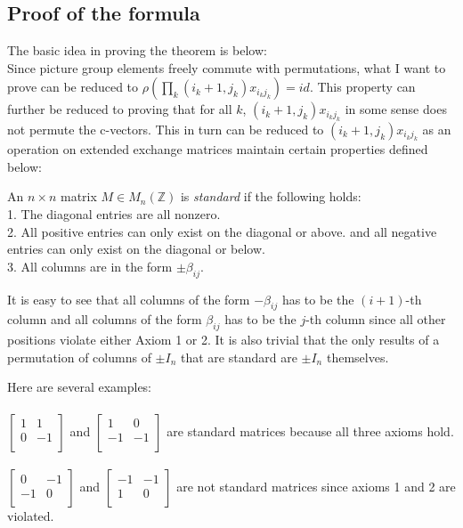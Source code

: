 \subsection{Proof of the formula}
\indent The basic idea in proving the theorem is below:\\
\indent Since picture group elements freely commute with permutations, what I want to prove can be reduced to  $\rho(\prod_{k}(i_k+1,j_k)x_{i_kj_k})=id$. This property can further be reduced to proving that for all $k$, $(i_k+1,j_k)x_{i_kj_k}$ in some sense does not permute the c-vectors. This in turn can be reduced to $(i_k+1,j_k)x_{i_kj_k}$ as an operation on extended exchange matrices maintain certain properties defined below:\\
\begin{definition}
An $n\times n$ matrix $M\in M_n(\mathbb{Z})$ is \textit{standard} if the following holds:\\
1. The diagonal entries are all nonzero.\\
2. All positive entries can only exist on the diagonal or above. and all negative entries can only exist on the diagonal or below.\\
3. All columns are in the form $\pm\beta_{ij}$.\\
\end{definition}
It is easy to see that all columns of the form $-\beta_{ij}$ has to be the $(i+1)$-th column and all columns of the form $\beta_{ij}$ has to be the $j$-th column since all other positions violate either Axiom 1 or 2. It is also trivial that the only results of a permutation of columns of $\pm I_n$ that are standard are $\pm I_n$ themselves.\\
\begin{example}
\indent Here are several examples:\\\\
$\begin{bmatrix}
1 & 1\\
0 & -1\\
\end{bmatrix}$ and
$\begin{bmatrix}
1 & 0\\
-1 & -1\\
\end{bmatrix}$ are standard matrices because all three axioms hold.\\\\
$\begin{bmatrix}
0 & -1\\
-1 & 0\\
\end{bmatrix}$ and
$\begin{bmatrix}
-1 & -1\\
1 & 0\\
\end{bmatrix}$ are not standard matrices since axioms 1 and 2 are violated.\\
\end{example}
